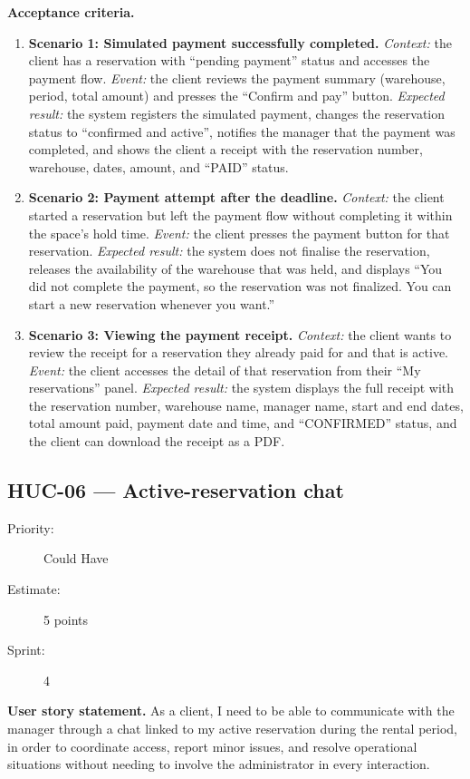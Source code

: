 \documentclass[11pt,a4paper,oneside]{report}
\begin{document}
\textbf{Acceptance criteria.}
\begin{enumerate}
\item \textbf{Scenario 1: Simulated payment successfully completed.} \emph{Context:} the client has a reservation with ``pending payment'' status and accesses the payment flow. \emph{Event:} the client reviews the payment summary (warehouse, period, total amount) and presses the ``Confirm and pay'' button. \emph{Expected result:} the system registers the simulated payment, changes the reservation status to ``confirmed and active'', notifies the manager that the payment was completed, and shows the client a receipt with the reservation number, warehouse, dates, amount, and ``PAID'' status.
\item \textbf{Scenario 2: Payment attempt after the deadline.} \emph{Context:} the client started a reservation but left the payment flow without completing it within the space's hold time. \emph{Event:} the client presses the payment button for that reservation. \emph{Expected result:} the system does not finalise the reservation, releases the availability of the warehouse that was held, and displays ``You did not complete the payment, so the reservation was not finalized. You can start a new reservation whenever you want.''
\item \textbf{Scenario 3: Viewing the payment receipt.} \emph{Context:} the client wants to review the receipt for a reservation they already paid for and that is active. \emph{Event:} the client accesses the detail of that reservation from their ``My reservations'' panel. \emph{Expected result:} the system displays the full receipt with the reservation number, warehouse name, manager name, start and end dates, total amount paid, payment date and time, and ``CONFIRMED'' status, and the client can download the receipt as a PDF.
\end{enumerate}

\subsection{HUC-06 --- Active-reservation chat}
\label{req:HUC-06}
\begin{description}
\item[Priority:] Could Have \quad \item[Estimate:] 5 points \quad \item[Sprint:] 4
\end{description}

\textbf{User story statement.} As a client, I need to be able to communicate with the manager through a chat linked to my active reservation during the rental period, in order to coordinate access, report minor issues, and resolve operational situations without needing to involve the administrator in every interaction.
\end{document}
